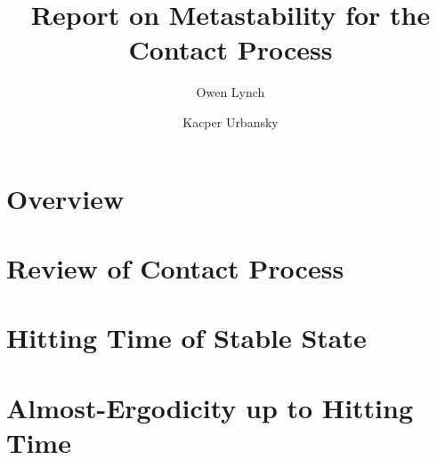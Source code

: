 \documentclass{scrartcl}
\title{Report on Metastability for the Contact Process}
\author{Owen Lynch \and Kacper Urbansky}
\begin{document}
\maketitle

\section{Overview}

\section{Review of Contact Process}

\section{Hitting Time of Stable State}

\section{Almost-Ergodicity up to Hitting Time}
\end{document}
